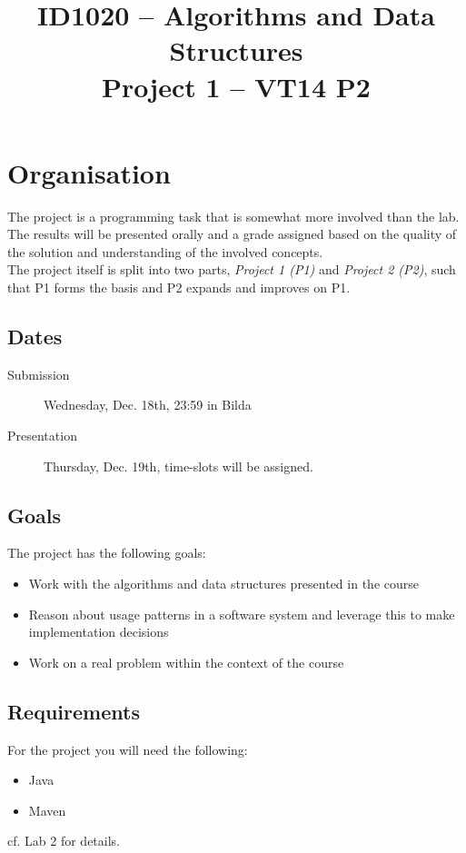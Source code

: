 \documentclass[11pt]{article}
\title{ID1020 -- Algorithms and Data Structures \\ Project 1 -- VT14 P2}
\author{}
\date{}                                           %
\begin{document}
\maketitle
\section{Organisation}
The project is a programming task that is somewhat more involved than the lab. The results will be presented orally and a grade assigned based on the quality of the solution and understanding of the involved concepts.\\

The project itself is split into two parts, \emph{Project 1 (P1)} and \emph{Project 2 (P2)}, such that P1 forms the basis and P2 expands and improves on P1.

\subsection{Dates}
\begin{description}
\item[Submission] Wednesday, Dec. 18th, 23:59 in Bilda
\item[Presentation] Thursday, Dec. 19th, time-slots will be assigned.
\end{description}

\subsection{Goals}
The project has the following goals:
\begin{itemize}
\item Work with the algorithms and data structures presented in the course
\item Reason about usage patterns in a software system and leverage this to make implementation decisions
\item Work on a real problem within the context of the course
\end{itemize}

\subsection{Requirements}
\label{ssec:reqs}
For the project you will need the following:
\begin{itemize}
\item Java
\item Maven
\end{itemize}
cf. Lab 2 for details.
\end{document}
